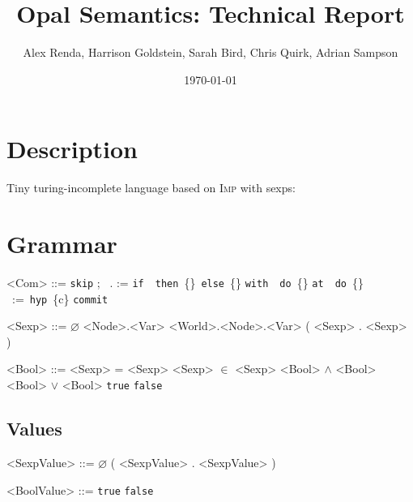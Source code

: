 \documentclass{article}
\title{Opal Semantics: Technical Report}
\author{Alex Renda, Harrison Goldstein, Sarah Bird, Chris Quirk, Adrian Sampson}
\date{\today}
\newcommand{\skipcom}{\texttt{skip}}
\newcommand{\seqcom}[2]{#1;\ #2}
\newcommand{\ifcom}[3]{\texttt{if}\ #1\ \texttt{then}\ \{#2\}\ \texttt{else}\ \{#3\}}
\newcommand{\withcom}[2]{\texttt{with}\ #1\ \texttt{do}\ \{#2\}}
\newcommand{\atcom}[2]{\texttt{at}\ #1\ \texttt{do}\ \{#2\}}
\newcommand{\assgncom}[2]{#1\ :=\ #2}
\newcommand{\commitcom}[1]{\texttt{commit}\ #1}
\newcommand{\hypwrld}[1]{\texttt{hyp}\ \{#1\}}
\newcommand{\true}{\texttt{true}}
\newcommand{\false}{\texttt{false}}
\newcommand{\imp}{\textsc{Imp}\xspace}
\begin{document}
\maketitle

\section{Description}

Tiny turing-incomplete language based on \imp with sexps:

\section{Grammar}

\begin{minipage}{0.5\textwidth}
\begin{grammar}
<Com> ::= \skipcom
\alt \seqcom{}{}
\alt {}. := 
\alt \ifcom{}{}{}
\alt \withcom{}{}
\alt \atcom{}{\synt{Com}}
\alt \assgncom{}{\hypwrld{c}}
\alt \commitcom{}

\end{grammar}
\end{minipage}
\begin{minipage}{0.5\textwidth}
\begin{grammar}

<Sexp> ::= $\varnothing$
\alt <Node>.<Var>
\alt <World>.<Node>.<Var>
\alt ( <Sexp> . <Sexp> )

<Bool> ::= <Sexp> = <Sexp>
\alt <Sexp> $\in$ <Sexp>
\alt <Bool> $\land$ <Bool>
\alt <Bool> $\lor$ <Bool>
\alt \true
\alt \false

\end{grammar}
\end{minipage}

\subsection{Values}

\begin{minipage}{0.5\textwidth}
\begin{grammar}

<SexpValue> ::= $\varnothing$
\alt ( <SexpValue> . <SexpValue> )

\end{grammar}
\end{minipage}
\begin{minipage}{0.5\textwidth}
\begin{grammar}

<BoolValue> ::= \true
\alt \false

\end{grammar}
\end{minipage}
\end{document}

